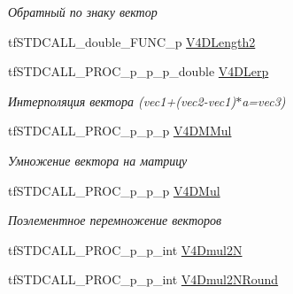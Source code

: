 \begin{DoxyCompactItemize}
\begin{DoxyCompactList}\small\item\em Обратный по знаку вектор \end{DoxyCompactList}\item 
tf\-S\-T\-D\-C\-A\-L\-L\-\_\-double\-\_\-\-F\-U\-N\-C\-\_\-p \hyperlink{structs_functions_vector_c_p_u_afe03555663eb7a6d5c87275e6ef512ae}{V4\-D\-Length2}
\item 
\hypertarget{structs_functions_vector_c_p_u_ad3aa6e11067be3aab6db3c35de82834b}{tf\-S\-T\-D\-C\-A\-L\-L\-\_\-\-P\-R\-O\-C\-\_\-p\-\_\-p\-\_\-p\-\_\-double \hyperlink{structs_functions_vector_c_p_u_ad3aa6e11067be3aab6db3c35de82834b}{V4\-D\-Lerp}}\label{structs_functions_vector_c_p_u_ad3aa6e11067be3aab6db3c35de82834b}

\begin{DoxyCompactList}\small\item\em Интерполяция вектора (vec1+(vec2-\/vec1)$\ast$a=vec3) \end{DoxyCompactList}\item 
\hypertarget{structs_functions_vector_c_p_u_aa21f6df0f46e39896de20eb1d857c45d}{tf\-S\-T\-D\-C\-A\-L\-L\-\_\-\-P\-R\-O\-C\-\_\-p\-\_\-p\-\_\-p \hyperlink{structs_functions_vector_c_p_u_aa21f6df0f46e39896de20eb1d857c45d}{V4\-D\-M\-Mul}}\label{structs_functions_vector_c_p_u_aa21f6df0f46e39896de20eb1d857c45d}

\begin{DoxyCompactList}\small\item\em Умножение вектора на матрицу \end{DoxyCompactList}\item 
\hypertarget{structs_functions_vector_c_p_u_ad5eb0733b77f9e78cc3ca8200bfd5677}{tf\-S\-T\-D\-C\-A\-L\-L\-\_\-\-P\-R\-O\-C\-\_\-p\-\_\-p\-\_\-p \hyperlink{structs_functions_vector_c_p_u_ad5eb0733b77f9e78cc3ca8200bfd5677}{V4\-D\-Mul}}\label{structs_functions_vector_c_p_u_ad5eb0733b77f9e78cc3ca8200bfd5677}

\begin{DoxyCompactList}\small\item\em Поэлементное перемножение векторов \end{DoxyCompactList}\item 
tf\-S\-T\-D\-C\-A\-L\-L\-\_\-\-P\-R\-O\-C\-\_\-p\-\_\-p\-\_\-int \hyperlink{structs_functions_vector_c_p_u_a794b717e9c3e5822831198162e1fce37}{V4\-Dmul2\-N}
\item 
\hypertarget{structs_functions_vector_c_p_u_a426459ef9318fd6c39069e6bdc6462e2}{tf\-S\-T\-D\-C\-A\-L\-L\-\_\-\-P\-R\-O\-C\-\_\-p\-\_\-p\-\_\-int \hyperlink{structs_functions_vector_c_p_u_a426459ef9318fd6c39069e6bdc6462e2}{V4\-Dmul2\-N\-Round}}\label{structs_functions_vector_c_p_u_a426459ef9318fd6c39069e6bdc6462e2}


\end{DoxyCompactItemize}
